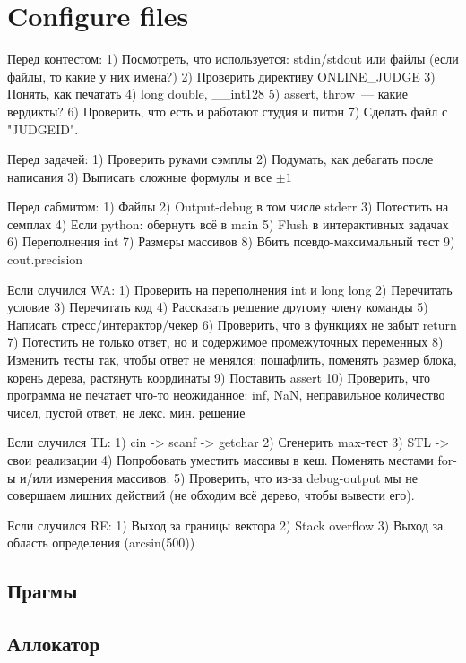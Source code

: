 \documentclass[14pt,a4paper,oneside]{article}
\begin{document}
\section{Configure files}



\newpage

Перед контестом:
1) Посмотреть, что используется: stdin/stdout или файлы (если файлы, то какие у них имена?)
2) Проверить директиву ONLINE\_JUDGE
3) Понять, как печатать
4) long double, \_\_int128
5) assert, throw~--- какие вердикты?
6) Проверить, что есть и работают студия и питон
7) Сделать файл с "JUDGEID".

Перед задачей:
1) Проверить руками сэмплы
2) Подумать, как дебагать после написания
3) Выписать сложные формулы и все $\pm 1$

Перед сабмитом:
1) Файлы
2) Output-debug в том числе stderr
3) Потестить на семплах
4) Если python: обернуть всё в main
5) Flush в интерактивных задачах
6) Переполнения int
7) Размеры массивов
8) Вбить псевдо-максимальный тест
9) cout.precision

Если случился WA:
1) Проверить на переполнения int и long long
2) Перечитать условие
3) Перечитать код
4) Рассказать решение другому члену команды
5) Написать стресс/интерактор/чекер
6) Проверить, что в функциях не забыт return
7) Потестить не только ответ, но и содержимое промежуточных переменных
8) Изменить тесты так, чтобы ответ не менялся: пошафлить, поменять размер блока, корень дерева, растянуть координаты
9) Поставить assert
10) Проверить, что программа не печатает что-то неожиданное: inf, NaN, неправильное количество чисел, пустой ответ, не лекс. мин. решение

Если случился TL:
1) cin -> scanf -> getchar
2) Сгенерить max-тест
3) STL -> свои реализации
4) Попробовать уместить массивы в кеш. Поменять местами for-ы и/или измерения массивов.
5) Проверить, что из-за debug-output мы не совершаем лишних действий (не обходим всё дерево, чтобы вывести его).

Если случился RE:
1) Выход за границы вектора
2) Stack overflow
3) Выход за область определения (arcsin(500))

\subsection{Прагмы}


\subsection{Аллокатор}

\end{document}
